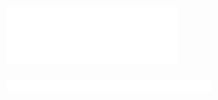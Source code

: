 \begin{frame}[plain,c]

  \begin{center}
    
 		\includegraphics[width=5cm]{fig/brand/logo-en-inverted-large.pdf}

  	\vspace*{15mm}    
    

  	\vspace*{20mm}    

    \includegraphics[width=6cm]{fig/brand/slogan-en-one-line-inverted-large.pdf}
  \end{center}


\end{frame}

\renewcommand{\arraystretch}{1}